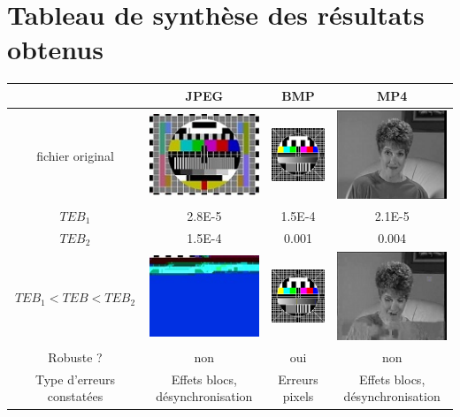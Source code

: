 \chapter{Tableau de synthèse des résultats obtenus}
\minitoc

\begin{tabular}{|c|c|c|c|}
\hline 
 & JPEG & BMP & MP4 \\ 
\hline 
fichier original & \includegraphics{test_jpeg.jpg} & \includegraphics{test.png} & \includegraphics{vlcsnap-origine.png} \\ 
\hline 
$TEB_1$ & 2.8E-5 & 1.5E-4 & 2.1E-5 \\ 
\hline 
$TEB_2$ & 1.5E-4 & 0.001 & 0.004 \\ 
\hline 
$TEB_1<TEB<TEB_2$ & \includegraphics{jpg_test_bruit63dB.jpg} & \includegraphics{BMP_test_bruit62dB.png} & \includegraphics{vlcsnap-bruit.png} \\ 
\hline 
Robuste ? & non & oui & non \\ 
\hline 
Type d'erreurs constatées & Effets blocs, désynchronisation & Erreurs pixels & Effets blocs, désynchronisation \\ 
\hline 
\end{tabular} 